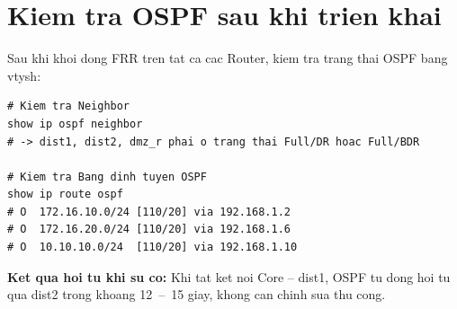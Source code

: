 \section{Kiem tra OSPF sau khi trien khai}

Sau khi khoi dong FRR tren tat ca cac Router, kiem tra trang thai OSPF bang vtysh:

\begin{lstlisting}
# Kiem tra Neighbor
show ip ospf neighbor
# -> dist1, dist2, dmz_r phai o trang thai Full/DR hoac Full/BDR

# Kiem tra Bang dinh tuyen OSPF
show ip route ospf
# O  172.16.10.0/24 [110/20] via 192.168.1.2
# O  172.16.20.0/24 [110/20] via 192.168.1.6
# O  10.10.10.0/24  [110/20] via 192.168.1.10
\end{lstlisting}

\textbf{Ket qua hoi tu khi su co:} Khi tat ket noi Core -- dist1, OSPF tu dong hoi tu qua dist2 trong khoang 12~--~15 giay, khong can chinh sua thu cong.
